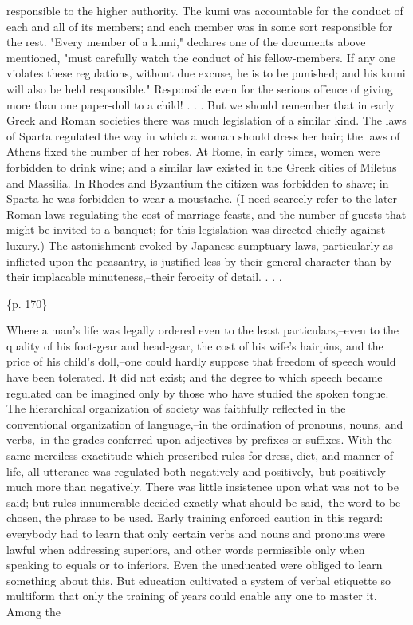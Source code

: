 responsible to the higher authority. The kumi was accountable for the conduct of each and all of its members; and each member was in some sort responsible for the rest. "Every member of a kumi," declares one of the documents above mentioned, "must carefully watch the conduct of his fellow-members. If any one violates these regulations, without due excuse, he is to be punished; and his kumi will also be held responsible." Responsible even for the serious offence of giving more than one paper-doll to a child! . . . But we should remember that in early Greek and Roman societies there was much legislation of a similar kind. The laws of Sparta regulated the way in which a woman should dress her hair; the laws of Athens fixed the number of her robes. At Rome, in early times, women were forbidden to drink wine; and a similar law existed in the Greek cities of Miletus and Massilia. In Rhodes and Byzantium the citizen was forbidden to shave; in Sparta he was forbidden to wear a moustache. (I need scarcely refer to the later Roman laws regulating the cost of marriage-feasts, and the number of guests that might be invited to a banquet; for this legislation was directed chiefly against luxury.) The astonishment evoked by Japanese sumptuary laws, particularly as inflicted upon the peasantry, is justified less by their general character than by their implacable minuteness,--their ferocity of detail. . . .

\{p. 170\}

Where a man's life was legally ordered even to the least particulars,--even to the quality of his foot-gear and head-gear, the cost of his wife's hairpins, and the price of his child's doll,--one could hardly suppose that freedom of speech would have been tolerated. It did not exist; and the degree to which speech became regulated can be imagined only by those who have studied the spoken tongue. The hierarchical organization of society was faithfully reflected in the conventional organization of language,--in the ordination of pronouns, nouns, and verbs,--in the grades conferred upon adjectives by prefixes or suffixes. With the same merciless exactitude which prescribed rules for dress, diet, and manner of life, all utterance was regulated both negatively and positively,--but positively much more than negatively. There was little insistence upon what was not to be said; but rules innumerable decided exactly what should be said,--the word to be chosen, the phrase to be used. Early training enforced caution in this regard: everybody had to learn that only certain verbs and nouns and pronouns were lawful when addressing superiors, and other words permissible only when speaking to equals or to inferiors. Even the uneducated were obliged to learn something about this. But education cultivated a system of verbal etiquette so multiform that only the training of years could enable any one to master it. Among the

